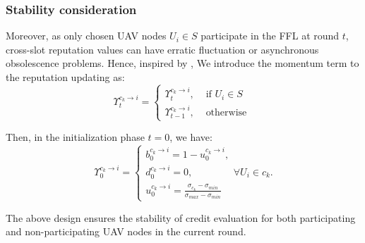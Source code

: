 \documentclass[lettersize,journal]{IEEEtran}
\begin{document}
\subsubsection{Stability consideration} 
Moreover, as only chosen UAV nodes $U_i\in S$ participate in the FFL at round $t$, cross-slot reputation values can have erratic fluctuation or asynchronous obsolescence problems. Hence, inspired by \cite{jhunjhunwala2022fedvarp}, We introduce the momentum term to the reputation updating as: 
\begin{equation}
\Upsilon^{c_k \rightarrow i}_{t}=
\left\{\begin{array}{ll}
\Upsilon^{c_k \rightarrow i}_{t} ,& \text { if } U_i \in S\\
\Upsilon^{c_k \rightarrow i}_{t-1},& \text { otherwise }
\end{array}\right.
\end{equation}

Then, in the initialization phase $t=0$, we have:
\begin{equation}
\Upsilon^{c_k \rightarrow i}_{0}=
\left  \{
      \begin{array}{ll}%
        b^{c_k \rightarrow i}_{0}=1-u^{c_k \rightarrow i}_{0},\\
        d^{c_k \rightarrow i}_{0}=0,\\
        u^{c_k \rightarrow i}_{0}=\frac{\sigma_{c_k}-\sigma_{min}}{\sigma_{max}-\sigma_{min}}
      \end{array}
\right.
\forall U_i\in c_k.
\end{equation}


The above design ensures the stability of credit evaluation for both participating and non-participating UAV nodes in the current round.
\end{document}
